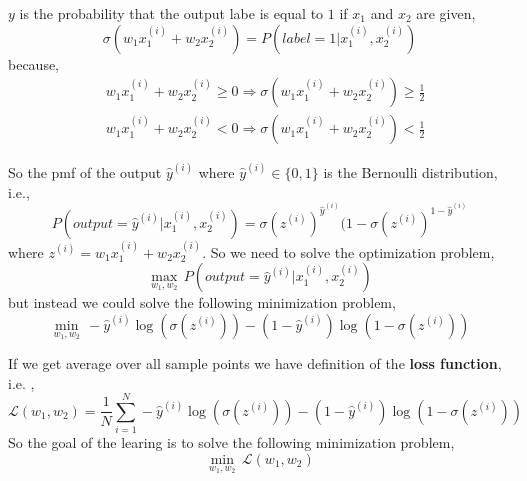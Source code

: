 \documentclass[12pt,aspectratio=169]{beamer}
\begin{document}
\begin{frame}
\begin{figure}
\end{figure}
\end{frame}

\begin{frame}
$y$ is the probability that the output labe is equal to $1$ if $x_1$ and $x_2$ are given,
\[
\sigma(w_1x_1^{(i)}+w_2x_2^{(i)})=P(label=1|x_1^{(i)},x_2^{(i)})
\]
because,
\[
\begin{aligned}
& w_1x_1^{(i)}+w_2x_2^{(i)}\geq 0\Rightarrow \sigma(w_1x_1^{(i)}+w_2x_2^{(i)})\geq \frac{1}{2}\\
& w_1x_1^{(i)}+w_2x_2^{(i)}< 0\Rightarrow \sigma(w_1x_1^{(i)}+w_2x_2^{(i)})< \frac{1}{2}
\end{aligned}
\]

\end{frame}

\begin{frame}
So the pmf of the output $\hat{y}^{(i)}$ where $\hat{y}^{(i)}\in \{0,1\}$ is the Bernoulli distribution, i.e.,
\[
P(output=\hat{y}^{(i)}|x_1^{(i)},x_2^{(i)})=\sigma(z^{(i)})^{\hat{y}^{(i)}}(1-\sigma(z^{(i)})^{1-\hat{y}^{(i)}}
\]
where $z^{(i)}=w_1x_1^{(i)}+w_2x_2^{(i)}$. So we need to solve the optimization problem,
\[
\max_{w_1,w_2}\,P(output=\hat{y}^{(i)}|x_1^{(i)},x_2^{(i)})
\]
but instead we could solve the following minimization problem,
\[
\min_{w_1,w_2}\,-\hat{y}^{(i)}\log(\sigma(z^{(i)}))-(1-\hat{y}^{(i)})\log(1-\sigma(z^{(i)}))
\]

\end{frame}

\begin{frame}
If we get average over all sample points we have definition of the \textbf{loss function}, i.e. ,
\[
\mathcal{L}(w_1,w_2)=\frac{1}{N}\sum_{i=1}^N-\hat{y}^{(i)}\log(\sigma(z^{(i)}))-(1-\hat{y}^{(i)})\log(1-\sigma(z^{(i)}))
\]
So the goal of the learing is to solve the following minimization problem,
\[
\min_{w_1,w_2}\,\mathcal{L}(w_1,w_2)
\]
\end{frame}
\end{document}
